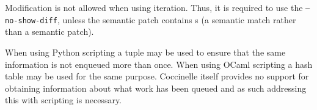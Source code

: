 Modification is not allowed when using iteration.  Thus, it is required to
use the {\tt --no-show-diff}, unless the semantic patch contains {\tt *}s
(a semantic match rather than a semantic patch).

When using Python scripting a tuple may be used
to ensure that the same information is not enqueued more than once.
When using OCaml scripting a hash table may be used for the same purpose.
Coccinelle itself provides no support for obtaining information about what
work has been queued and as such addressing
this with scripting is necessary.

